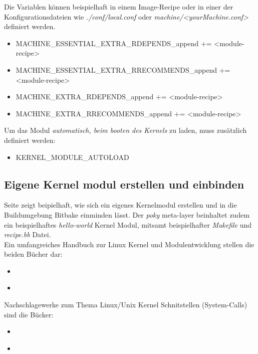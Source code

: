Die Variablen können beispielhaft in einem Image-Recipe oder in einer der
Konfigurationsdateien wie \textit{./conf/local.conf} oder
\textit{machine/<yourMachine.conf>}  definiert werden.

\begin{itemize}
    \item MACHINE\_ESSENTIAL\_EXTRA\_RDEPENDS\_append +=  <module-recipe>
    \item MACHINE\_ESSENTIAL\_EXTRA\_RRECOMMENDS\_append += <module-recipe>
    \item MACHINE\_EXTRA\_RDEPENDS\_append += <module-recipe>
    \item MACHINE\_EXTRA\_RRECOMMENDS\_append += <module-recipe>
\end{itemize}

Um das Modul \textit{automatisch, beim booten des Kernels} zu laden, muss
zusätzlich definiert werden:

\begin{itemize}
    \item KERNEL\_MODULE\_AUTOLOAD
\end{itemize}


\subsection{Eigene Kernel modul erstellen und einbinden}%
\label{sub:eigene_kernel_modul_erstellen_und_einbinden}


Seite \cite[121-125]{Gonzalez2018:Embedded_Linux_Development_Using_Yocto_Project_Cookbook_2nd}
zeigt beipielhaft, wie sich ein eigenes Kernelmodul erstellen und in die
Buildumgebung Bitbake einminden lässt. Der \textit{poky} meta-layer beinhaltet
zudem ein beispielhaftes \textit{hello-world} Kernel Modul, mitsamt
beispielhafter \textit{Makefile} und \textit{recipe.bb} Datei.
\\
Ein umfangreiches Handbuch zur Linux Kernel und Modulentwicklung stellen die
beiden Bücher dar:
\begin{itemize}
    \item \cite{Quade2015}
    \item \cite{Corbet2005}
\end{itemize}

Nachschlagewerke zum Thema Linux/Unix Kernel Schnitstellen (System-Calls) sind
die Bücker:
\begin{itemize}
    \item \cite{Kerrisk2010}
    \item \cite{Rago2013}
\end{itemize}










